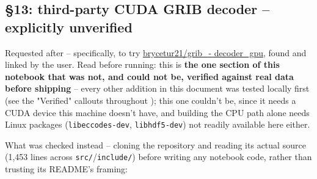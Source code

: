 \documentclass[11pt]{article}
\begin{document}
\subsection{\S13: third-party CUDA GRIB decoder -- explicitly unverified}
\label{sec:third-party-grib-gpu}

Requested after  -- specifically, to try
\href{https://github.com/brycetur21/grib_decoder_gpu}{brycetur21/grib\_-
decoder\_gpu}, found and linked by the user. Read before running: this is
\textbf{the one section of this notebook that was not, and could not be,
verified against real data before shipping} -- every other addition in
this document was tested locally first (see the "Verified" callouts
throughout ); this one
couldn't be, since it needs a CUDA device this machine doesn't have, and
building the CPU path alone needs Linux packages (\texttt{libeccodes-dev},
\texttt{libhdf5-dev}) not readily available here either.

What was checked instead -- cloning the repository and reading its actual
source (1{,}453 lines across \texttt{src/}/\texttt{include/}) before
writing any notebook code, rather than trusting its README's framing:
\end{document}
